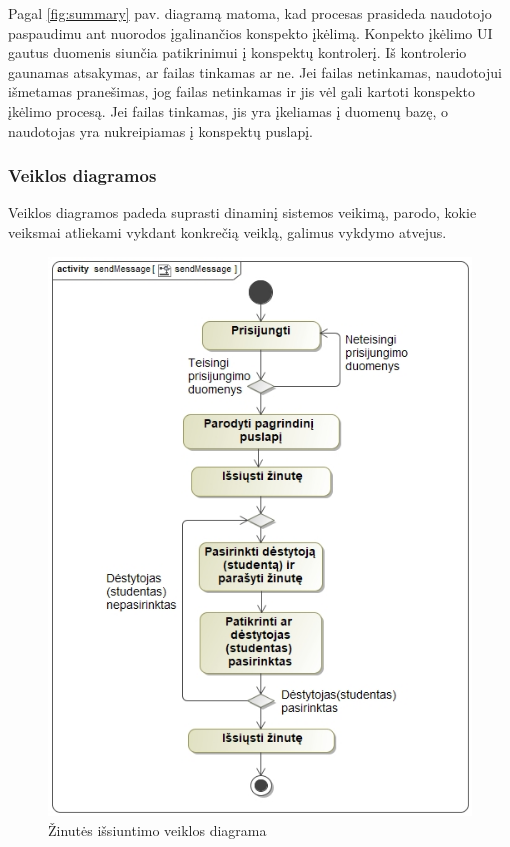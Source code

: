 \documentclass{VUMIFPSkursinis}
\begin{document}
	Pagal \ref{fig:summary} pav. diagramą matoma, kad procesas prasideda naudotojo paspaudimu ant nuorodos įgalinančios konspekto įkėlimą. Konpekto įkėlimo UI gautus duomenis siunčia patikrinimui į konspektų kontrolerį. Iš kontrolerio
	gaunamas atsakymas, ar failas tinkamas ar ne. Jei failas netinkamas, naudotojui išmetamas pranešimas,
	jog failas netinkamas ir jis vėl gali kartoti konspekto įkėlimo procesą. Jei failas tinkamas, jis yra įkeliamas į duomenų bazę, o
	naudotojas yra nukreipiamas į konspektų puslapį.
	\subsubsection{Veiklos diagramos}
	Veiklos diagramos padeda suprasti dinaminį sistemos
	veikimą, parodo, kokie veiksmai atliekami vykdant konkrečią veiklą, galimus vykdymo atvejus.
	\begin{figure}[H]
		\centering
		\includegraphics[scale=0.65]{img/sendMessage.jpg}
		\caption{Žinutės išsiuntimo veiklos diagrama}
		\label{fig:sendMessage}
	\end{figure}
\end{document}
